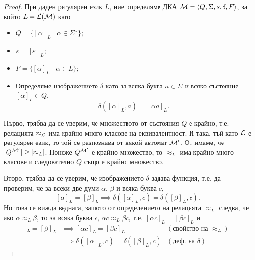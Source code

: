 \begin{proof}
  При даден регулярен език $L$, ние определяме ДКА $\mathcal{M} = \langle{Q,\Sigma,s,\delta,F}\rangle$, за който $L = \mathcal{L}(\mathcal{M})$ като
  \begin{itemize}
  \item
    $Q = \{[\alpha]_L\mid \alpha\in \Sigma^\star\}$;
  \item
    $s = [\varepsilon]_L$;
  \item
    $F = \{[\alpha]_L\mid \alpha\in L\}$;
  \item
    Определяме изображението $\delta$ като 
    за всяка буква $a \in \Sigma$ и всяко състояние $[\alpha]_L\in Q$, 
    \[\delta([\alpha]_L,a) = [\alpha a]_L.\]
  \end{itemize}
  
  Първо, трябва да се уверим, че множеството от състояния $Q$ е крайно, т.е.
  релацията $\approx_{\mathcal{L}}$ има крайно много класове на еквивалентност.
  И така, тъй като $\mathcal{L}$ е регулярен език, то той се разпознава от някой автомат $\mathcal{M}^\prime$.
  От  имаме, че $\lvert{Q^{\mathcal{M}'}}\rvert \geq \lvert{\approx_L}\rvert$.
  Понеже $Q^{\mathcal{M}'}$ е крайно множество, то $\approx_L$ има крайно много класове и 
  следователно $Q$ също е крайно множество.

  Второ, трябва да се уверим, че изображението $\delta$ задава функция, т.е. 
  да проверим, че за всеки две думи $\alpha$, $\beta$ и всяка буква $c$,
  \[[\alpha]_L = [\beta]_L \implies \delta([\alpha]_L,c) = \delta([\beta]_L,c).\]
  Но това се вижда веднага, защото от определението на релацията $\approx_L$ следва, че
  ако $\alpha \approx_L \beta$, то за всяка буква $c$, $\alpha c \approx_L \beta c$,
  т.е. $[\alpha c]_L = [\beta c]_L$ и 
  \begin{align*}
    [\alpha]_L = [\beta]_L & \implies [\alpha c]_L = [\beta c]_L & (\text{свойство на }\approx_L)\\
    & \implies \delta([\alpha]_L,c) = \delta([\beta]_L,c) & (\text{деф. на }\delta)
  \end{align*}
  

\end{proof}
